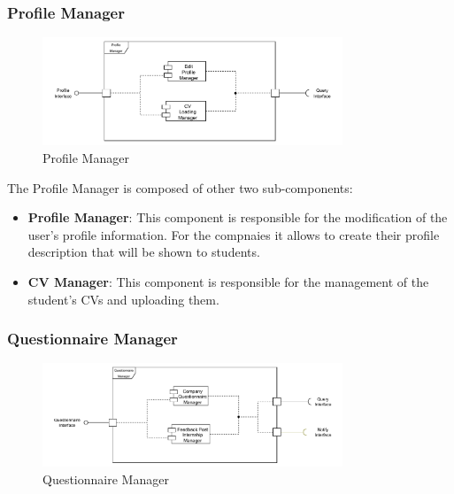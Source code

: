 \subsubsection{Profile Manager}
\label{subsub:profile-manager}

\begin{figure}[H]
      \centering
      \includegraphics[width=0.8\textwidth]{Images/Profile_Architecture.pdf}
      \caption{Profile Manager}
      \label{profile-manager-arch}
\end{figure}

\par The Profile Manager is composed of other two sub-components:
\begin{itemize}
      \item \textbf{Profile Manager}: This component is responsible for the modification of the user's profile information.
            For the compnaies it allows to create their profile description that will be shown to students.
      \item \textbf{CV Manager}: This component is responsible for the management of the student's CVs and uploading them.
\end{itemize}

\subsubsection{Questionnaire Manager}
\label{subsub:questionnaire-manager}

\begin{figure}[H]
      \centering
      \includegraphics[width=0.8\textwidth]{Images/Questionnaire_Architecture.pdf}
      \caption{Questionnaire Manager}
      \label{questionnaire-manager-arch}
\end{figure}

